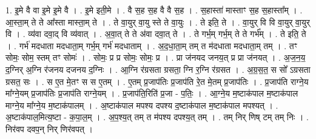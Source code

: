 \documentclass[17pt]{extarticle}
\begin{document}
1. इ॒मे वै वा इ॒मे इ॒मे वै । . इ॒मे इती॒मे । . वै स॒ह स॒ह वै वै स॒ह । . स॒हास्ता॑ मास्ताꣳ स॒ह स॒हास्ता᳚म् । . आ॒स्ता॒म् ते ते आ᳚स्ता मास्ता॒म् ते । . ते वा॒युर् वा॒यु स्ते ते वा॒युः । . ते इति॒ ते । . वा॒युर् वि वि वा॒युर् वा॒युर् वि । . व्य॑वा दवा॒द् वि व्य॑वात् । . अ॒वा॒त् ते ते अ॑वा दवा॒त् ते । . ते गर्भ॒म् गर्भ॒म् ते ते गर्भ᳚म् । . ते इति॒ ते । . गर्भ॑ मदधाता मदधाता॒म् गर्भ॒म् गर्भ॑ मदधाताम् । . अ॒द॒धा॒ता॒म् तम् त म॑दधाता मदधाता॒म् तम् । . तꣳ सोमः॒ सोम॒ स्तम् तꣳ सोमः॑ । . सोमः॒ प्र प्र सोमः॒ सोमः॒ प्र । . प्रा ज॑नयद जनय॒त् प्र प्रा ज॑नयत् । . अ॒ज॒न॒य॒ द॒ग्निर् अ॒ग्नि र॑जनय दजनय द॒ग्निः । . आ॒ग्नि र॑ग्रसता ग्रसता॒ ग्नि र॒ग्नि र॑ग्रसत । . अ॒ग्र॒स॒त॒ स सो᳚ ऽग्रसता ग्रसत॒ सः । . स ए॒त मे॒तꣳ स स ए॒तम् । . ए॒तम् प्र॒जाप॑तिः प्र॒जाप॑ति रे॒त मे॒तम् प्र॒जाप॑तिः । . प्र॒जाप॑ति राग्ने॒य मा᳚ग्ने॒यम् प्र॒जाप॑तिः प्र॒जाप॑ति राग्ने॒यम् । . प्र॒जाप॑ति॒रिति॑ प्र॒जा - प॒तिः॒ । . आ॒ग्ने॒य म॒ष्टाक॑पाल म॒ष्टाक॑पाल माग्ने॒य मा᳚ग्ने॒य म॒ष्टाक॑पालम् । . अ॒ष्टाक॑पाल मपश्य दपश्य द॒ष्टाक॑पाल म॒ष्टाक॑पाल मपश्यत् । . अ॒ष्टाक॑पाल॒मित्य॒ष्टा - क॒पा॒ल॒म् । . अ॒प॒श्य॒त् तम् त म॑पश्य दपश्य॒त् तम् । . तम् निर् णिष् टम् तम् निः । . निर॑वप दवप॒न् निर् णिर॑वपत् । \newline
\end{document}
